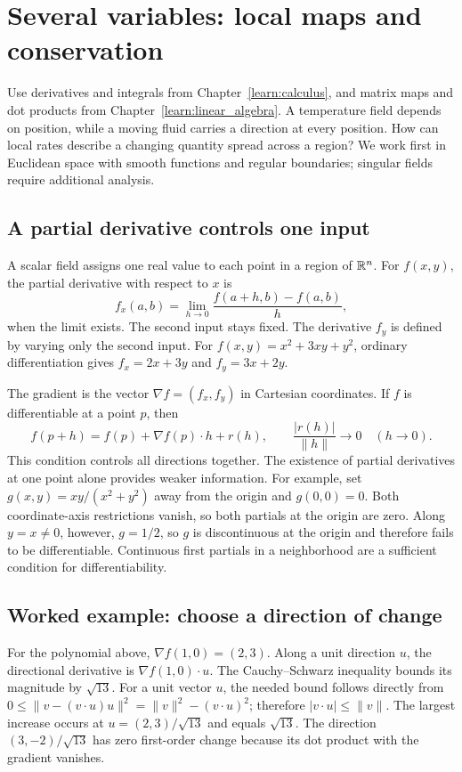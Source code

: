 \chapter{Several variables: local maps and conservation}
\label{learn:multivariable}



Use derivatives and integrals from Chapter~\ref{learn:calculus}, and matrix
maps and dot products from Chapter~\ref{learn:linear_algebra}. A temperature
field depends on position, while a moving fluid carries a direction at every
position. How can local rates describe a changing quantity spread across a
region? We work first in Euclidean space with smooth functions and regular
boundaries; singular fields require additional analysis.



\section{A partial derivative controls one input}
A scalar field assigns one real value to each point in a region of $\mathbb{R}^n$.
For $f(x,y)$, the partial derivative with respect to $x$ is
\[
 f_x(a,b)=\lim_{h\to0}\frac{f(a+h,b)-f(a,b)}h,
\]
when the limit exists. The second input stays fixed. The derivative $f_y$
is defined by varying only the second input. For
$f(x,y)=x^2+3xy+y^2$, ordinary differentiation gives
$f_x=2x+3y$ and $f_y=3x+2y$.

The gradient is the vector $\nabla f=(f_x,f_y)$ in Cartesian coordinates.
If $f$ is differentiable at a point $p$, then
\[
 f(p+h)=f(p)+\nabla f(p)\cdot h+r(h),\qquad
 \frac{|r(h)|}{\|h\|}\longrightarrow0\quad(h\to0).
\]
This condition controls all directions together. The existence of partial
derivatives at one point alone provides weaker information. For example,
set $g(x,y)=xy/(x^2+y^2)$ away from the origin and $g(0,0)=0$.
Both coordinate-axis restrictions vanish, so both partials at the origin
are zero. Along $y=x\ne0$, however, $g=1/2$, so $g$ is discontinuous
at the origin and therefore fails to be differentiable. Continuous first
partials in a neighborhood are a sufficient condition for differentiability.

\section{Worked example: choose a direction of change}
For the polynomial above, $\nabla f(1,0)=(2,3)$. Along a unit direction
$u$, the directional derivative is $\nabla f(1,0)\cdot u$.
The Cauchy--Schwarz inequality bounds its magnitude by $\sqrt{13}$.
For a unit vector $u$, the needed bound follows directly from
$0\leq\|v-(v\cdot u)u\|^2=\|v\|^2-(v\cdot u)^2$;
therefore $|v\cdot u|\leq\|v\|$.
The largest increase occurs at $u=(2,3)/\sqrt{13}$ and equals
$\sqrt{13}$. The direction $(3,-2)/\sqrt{13}$ has zero first-order
change because its dot product with the gradient vanishes.

